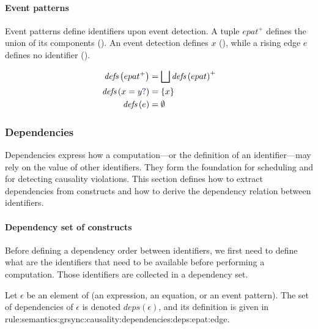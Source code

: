 \paragraph{Event patterns}

Event patterns define identifiers upon event detection. A tuple $epat^+$ defines the union of its
components (). An event detection  defines
$x$ (), while a rising edge $e$ defines
no identifier ().

\begin{align}
    \defs{epat^+}        & = \bigsqcup \defs{epat}^+ \label{rule:semantics:grsync:causality:defs:epat} \\
    \defs{\detect{x}{y}} & = \{x\} \label{rule:semantics:grsync:causality:defs:epat:event}             \\
    \defs{e}             & = \emptyset \label{rule:semantics:grsync:causality:defs:epat:edge}
\end{align}

\subsubsection{Dependencies}
\label{sec:semantics:grsync:causality:dependencies}

Dependencies express how a computation---or the definition of an identifier---may rely on the value
of other identifiers. They form the foundation for scheduling and for detecting causality
violations. This section defines how to extract dependencies from \GRSync constructs and how to
derive the dependency relation between identifiers.

\paragraph{Dependency set of constructs}
\label{sec:semantics:grsync:causality:dependencies:deps}

\newcommand{\deps}[1]{{\ensuremath{\textit{deps}\left(#1\right)}}}

Before defining a dependency order between identifiers, we first need to define what are the
identifiers that need to be available before performing a computation. Those identifiers are
collected in a dependency set.

\begin{definition}
    Let $\epsilon$ be an element of \GRSync (an expression, an equation, or an event pattern).
    The set of dependencies of $\epsilon$ is denoted \deps{\epsilon}, and its definition is given in
    {rule:semantics:grsync:causality:dependencies:deps:epat:edge}.
\end{definition}

